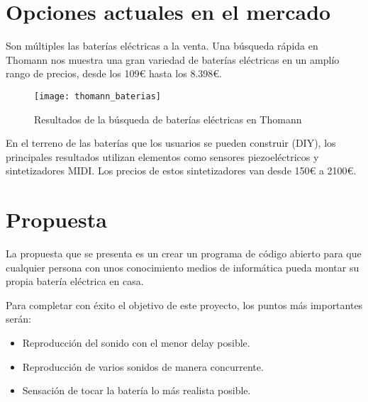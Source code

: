 

    \section{Opciones actuales en el mercado} %
    \label{sec:OpcionesActualesEnElMercado}

        Son múltiples las baterías eléctricas a la venta. Una búsqueda rápida en Thomann \cite{thomann_baterias} nos
        muestra una gran variedad de baterías eléctricas en un amplío rango de precios, desde los 109\euro{} hasta los
        8.398\euro{}.

        \begin{figure}[ht]
            \centering
            \texttt{[image: thomann\_baterias]}
            \caption{Resultados de la búsqueda de baterías eléctricas en Thomann \cite{thomann_baterias}
                     \label{fig:ThomannBusqueda}}
        \end{figure}

        En el terreno de las baterías que los usuarios se pueden construir (DIY), los principales resultados
        \cite{drum_magazine_diy_kit} utilizan elementos como sensores piezoeléctricos y sintetizadores MIDI. Los precios
        de estos sintetizadores van desde 150\euro{} a 2100\euro{}.


    \section{Propuesta} %
    \label{sec:Propuesta}

        La propuesta que se presenta es un crear un programa de código abierto para que cualquier persona con unos
        conocimiento medios de informática pueda montar su propia batería eléctrica en casa.

        Para completar con éxito el objetivo de este proyecto, los puntos más importantes serán:

        \begin{itemize}
            \item Reproducción del sonido con el menor delay posible.
            \item Reproducción de varios sonidos de manera concurrente.
            \item Sensación de tocar la batería lo más realista posible.
        \end{itemize}


